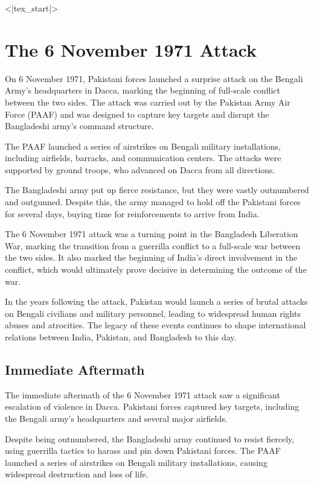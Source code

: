  <|tex_start|>

\chapter{The 6 November 1971 Attack}

On 6 November 1971, Pakistani forces launched a surprise attack on the Bengali Army's headquarters in Dacca, marking the beginning of full-scale conflict between the two sides. The attack was carried out by the Pakistan Army Air Force (PAAF) and was designed to capture key targets and disrupt the Bangladeshi army's command structure.

The PAAF launched a series of airstrikes on Bengali military installations, including airfields, barracks, and communication centers. The attacks were supported by ground troops, who advanced on Dacca from all directions.

The Bangladeshi army put up fierce resistance, but they were vastly outnumbered and outgunned. Despite this, the army managed to hold off the Pakistani forces for several days, buying time for reinforcements to arrive from India.

The 6 November 1971 attack was a turning point in the Bangladesh Liberation War, marking the transition from a guerrilla conflict to a full-scale war between the two sides. It also marked the beginning of India's direct involvement in the conflict, which would ultimately prove decisive in determining the outcome of the war.

In the years following the attack, Pakistan would launch a series of brutal attacks on Bengali civilians and military personnel, leading to widespread human rights abuses and atrocities. The legacy of these events continues to shape international relations between India, Pakistan, and Bangladesh to this day.

\section{Immediate Aftermath}

The immediate aftermath of the 6 November 1971 attack saw a significant escalation of violence in Dacca. Pakistani forces captured key targets, including the Bengali army's headquarters and several major airfields.

Despite being outnumbered, the Bangladeshi army continued to resist fiercely, using guerrilla tactics to harass and pin down Pakistani forces. The PAAF launched a series of airstrikes on Bengali military installations, causing widespread destruction and loss of life.

